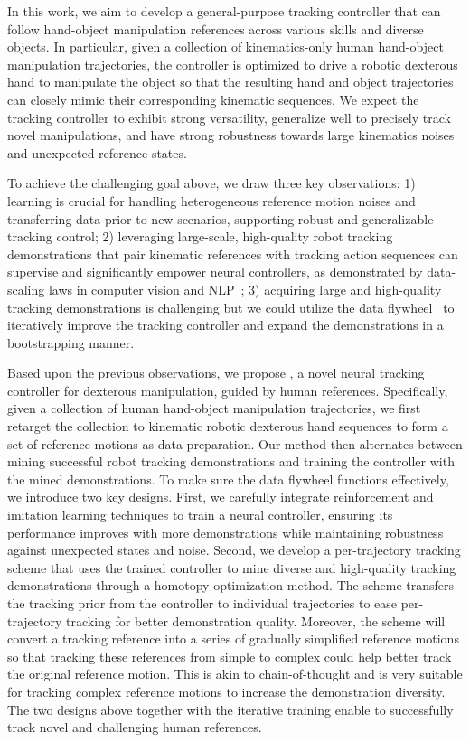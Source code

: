 In this work, we aim to develop a general-purpose tracking controller that can follow hand-object manipulation references across various skills and diverse objects. In particular, given a collection of kinematics-only human hand-object manipulation trajectories, the controller is optimized to drive a robotic dexterous hand to manipulate the object so that the resulting hand and object trajectories can closely mimic their corresponding kinematic sequences. 
We expect the tracking controller to exhibit strong versatility, generalize well to precisely track novel manipulations, and have strong robustness towards large kinematics noises and unexpected reference states. 


To achieve the challenging goal above, we draw three key observations: 1) learning is crucial for handling heterogeneous reference motion noises and transferring data prior to new scenarios, supporting robust and generalizable tracking control; 2) leveraging large-scale, high-quality robot tracking demonstrations that pair kinematic references with tracking action sequences can supervise and significantly empower neural controllers, as demonstrated by data-scaling laws in computer vision and NLP~\citep{Achiam2023GPT4TR,Brown2020LanguageMA}; 3) acquiring large and high-quality tracking demonstrations is challenging but we could utilize the data flywheel~\citep{Chiang2024ChatbotAA,Bai2023QwenTR} to iteratively improve the tracking controller and expand the demonstrations in a bootstrapping manner.


Based upon the previous observations, we propose \modelnamenspace, a novel neural tracking controller for dexterous manipulation, guided by human references. Specifically, given a collection of human hand-object manipulation trajectories, we first retarget the collection to kinematic robotic dexterous hand sequences to form a set of reference motions as data preparation. Our method then alternates between mining successful robot tracking demonstrations and training the controller with the mined demonstrations. To make sure the data flywheel functions effectively, we introduce two key designs. First, we carefully integrate reinforcement and imitation learning techniques to train a neural controller, ensuring its performance improves with more demonstrations while maintaining robustness against unexpected states and noise. Second, we develop a per-trajectory tracking scheme that uses the trained controller to mine diverse and high-quality tracking demonstrations through a homotopy optimization method. The scheme transfers the tracking prior from the controller to individual trajectories to ease per-trajectory tracking for better demonstration quality. Moreover, the scheme will convert a tracking reference into a series of gradually simplified reference motions so that tracking these references from simple to complex could help better track the original reference motion. This is akin to chain-of-thought and is very suitable for tracking complex reference motions to increase the demonstration diversity. The two designs above together with the iterative training enable \modelname to successfully track novel and challenging human references.


